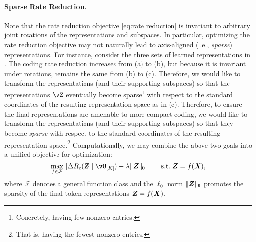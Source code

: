 \documentclass[../../book-main.tex]{subfiles}
\begin{document}
\paragraph{Sparse Rate Reduction.} Note that the rate reduction objective \eqref{eq:rate reduction} is invariant to arbitrary joint rotations of the representations and subspaces. In particular, optimizing the rate reduction objective may not naturally lead to axis-aligned (i.e., \textit{sparse}) representations. {For instance, consider the three sets of learned representations in . The coding rate reduction increases from (a) to (b), but because it is invariant under rotations, remains the same from (b) to (c).} Therefore, we would like to transform the representations (and their supporting subspaces) so that the representations $\vZ$ eventually become sparse\footnote{Concretely, having few nonzero entries.} with respect to the standard coordinates of the resulting representation space {as in (c)}. Therefore, to ensure the final representations are amenable to more compact coding, we would like to transform the representations (and their supporting subspaces) so that they become \textit{sparse} with respect to the standard coordinates of the resulting representation space.\footnote{That is, having the fewest nonzero entries.} Computationally, we may combine the above two goals into a unified objective for optimization:
\begin{equation}
   \max_{f \in \mathcal{F}}\ [\Delta R_{\epsilon}(\Z \mid \vU_{[K]}) - \lambda \|\bm{Z}\|_0] \qquad \text{s.t.}\ \Z = f(\X),
   \label{eq:sparse-rr}
\end{equation}
where $\mathcal{F}$ denotes a general function class and the $\ell_0$ norm $\|\bm{Z}\|_0$ promotes the sparsity of the final token representations \(\bm{Z} = f(\bm{X})\).%
\end{document}
